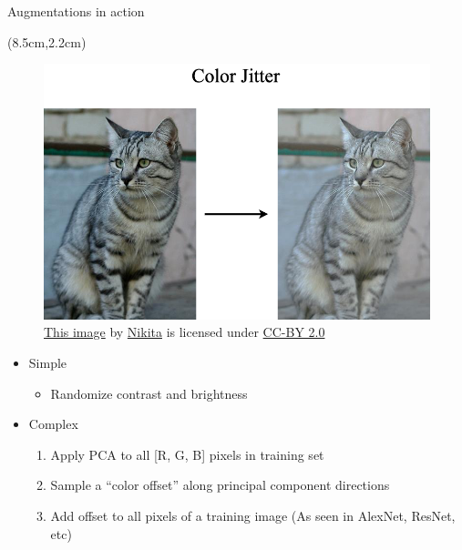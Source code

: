 \documentclass[serif, aspectratio=169]{beamer}
\begin{document}
\begin{frame}{Augmentations in action}
	\begin{textblock*}{7cm}(8.5cm,2.2cm) %
		\begin{figure}
			\includegraphics[keepaspectratio, scale=0.24]{pic/jitter}
			\caption*{\tiny{\href{https://www.flickr.com/photos/malfet/1428198050}{\color{blue} This image} by \href{https://www.flickr.com/photos/malfet/}{\color{blue} Nikita} is licensed under \href{https://creativecommons.org/licenses/by/2.0/}{\color{blue} CC-BY 2.0}}}
		\end{figure}

	\end{textblock*}
	
	\begin{itemize}
		\item Simple
		\begin{itemize}
			\item Randomize contrast and brightness
		\end{itemize}
		\item Complex
		\begin{enumerate}
			\item Apply PCA to all [R, G, B] pixels \newline in training set
			\item Sample a “color offset” along principal \newline component directions
			\item Add offset to all pixels of a training \newline image
			\newline \small{(As seen in AlexNet, ResNet, etc)}
		\end{enumerate}
	\end{itemize}
\end{frame}
\end{document}
